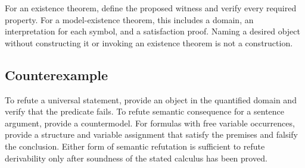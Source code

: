 For an existence theorem, define the proposed witness and verify every required
property.  For a model-existence theorem, this includes a domain, an
interpretation for each symbol, and a satisfaction proof.  Naming a desired
object without constructing it or invoking an existence theorem is not a
construction.

\subsection{Counterexample}

To refute a universal statement, provide an object in the quantified domain and
verify that the predicate fails.  To refute semantic consequence for a
sentence argument, provide a countermodel.  For formulas with free variable
occurrences, provide a structure and variable assignment that satisfy the
premises and falsify the conclusion.  Either form of semantic refutation is
sufficient to refute derivability only after soundness of the stated calculus
has been proved.

